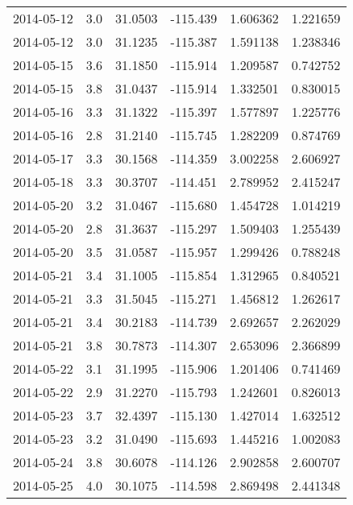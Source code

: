 \begin{tabular}{lrrrrr}
2014-05-12 &       3.0 &  31.0503 &  -115.439 &         1.606362 &         1.221659 \\
2014-05-12 &       3.0 &  31.1235 &  -115.387 &         1.591138 &         1.238346 \\
2014-05-15 &       3.6 &  31.1850 &  -115.914 &         1.209587 &         0.742752 \\
2014-05-15 &       3.8 &  31.0437 &  -115.914 &         1.332501 &         0.830015 \\
2014-05-16 &       3.3 &  31.1322 &  -115.397 &         1.577897 &         1.225776 \\
2014-05-16 &       2.8 &  31.2140 &  -115.745 &         1.282209 &         0.874769 \\
2014-05-17 &       3.3 &  30.1568 &  -114.359 &         3.002258 &         2.606927 \\
2014-05-18 &       3.3 &  30.3707 &  -114.451 &         2.789952 &         2.415247 \\
2014-05-20 &       3.2 &  31.0467 &  -115.680 &         1.454728 &         1.014219 \\
2014-05-20 &       2.8 &  31.3637 &  -115.297 &         1.509403 &         1.255439 \\
2014-05-20 &       3.5 &  31.0587 &  -115.957 &         1.299426 &         0.788248 \\
2014-05-21 &       3.4 &  31.1005 &  -115.854 &         1.312965 &         0.840521 \\
2014-05-21 &       3.3 &  31.5045 &  -115.271 &         1.456812 &         1.262617 \\
2014-05-21 &       3.4 &  30.2183 &  -114.739 &         2.692657 &         2.262029 \\
2014-05-21 &       3.8 &  30.7873 &  -114.307 &         2.653096 &         2.366899 \\
2014-05-22 &       3.1 &  31.1995 &  -115.906 &         1.201406 &         0.741469 \\
2014-05-22 &       2.9 &  31.2270 &  -115.793 &         1.242601 &         0.826013 \\
2014-05-23 &       3.7 &  32.4397 &  -115.130 &         1.427014 &         1.632512 \\
2014-05-23 &       3.2 &  31.0490 &  -115.693 &         1.445216 &         1.002083 \\
2014-05-24 &       3.8 &  30.6078 &  -114.126 &         2.902858 &         2.600707 \\
2014-05-25 &       4.0 &  30.1075 &  -114.598 &         2.869498 &         2.441348 \\

\end{tabular}
